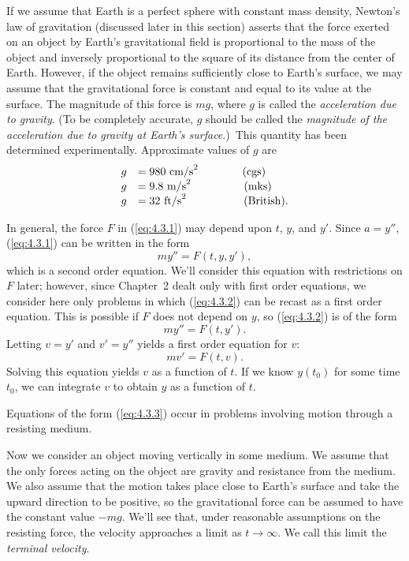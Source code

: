 If we assume that Earth is a perfect sphere with constant mass density, Newton's law of gravitation
(discussed later in this section) asserts that the force exerted on an object by Earth's
gravitational field is proportional to the mass of the object and inversely proportional to the
square of its distance from the center of Earth. However, if the object remains sufficiently close
to Earth's surface, we may assume that the gravitational force is constant and equal to its value at
the surface. The magnitude of this force is $mg$, where $g$ is called the {\color{blue}\it
acceleration due to gravity}. (To be completely accurate, $g$ should be called the {\color{blue}\it
magnitude of the acceleration due to gravity at Earth's surface}.)\
This quantity has been determined experimentally. Approximate values of $g$ are
\[
  \begin{array}{rl}
    g & =980\ \mbox{cm/s}^{2}\hskip40pt\mbox{(cgs)}     \\
    g & =9.8\ \mbox{m/s}^{2}\hskip48pt\mbox{(mks)}      \\
    g & =32\ \mbox{ft/s}^{2}\hskip52pt\mbox{(British)}.
  \end{array}
\]

In general, the force $F$ in (\ref{eq:4.3.1}) may depend upon $t$, $y$, and $y'$. Since $a=y''$,
(\ref{eq:4.3.1}) can be written in the form
\begin{equation}
  \label{eq:4.3.2}my''=F(t,y,y'),
\end{equation}
which is a second order equation. We'll consider this equation with restrictions on $F$ later;
however, since Chapter~2 dealt only with first order equations, we consider here only problems in
which (\ref{eq:4.3.2}) can be recast as a first order equation. This is possible if $F$ does not
depend on $y$, so (\ref{eq:4.3.2}) is of the form
\[
  my''=F(t,y').
\]
Letting $v=y'$ and $v'=y''$ yields a first order equation for $v$:
\begin{equation}
  \label{eq:4.3.3}mv'=F(t,v).
\end{equation}
Solving this equation yields $v$ as a function of $t$. If we know $y(t_{0})$ for some time $t_{0}$,
we can integrate $v$ to obtain $y$ as a function of $t$.

Equations of the form (\ref{eq:4.3.3}) occur in problems involving motion through a resisting
medium.


\noindent
Now we consider an object moving vertically in some medium. We assume that the only forces acting on
the object are gravity and resistance from the medium. We also assume that the motion takes place
close to Earth's surface and take the upward direction to be positive, so the gravitational force
can be assumed to have the constant value $-mg$. We'll see that, under reasonable assumptions on the
resisting force, the velocity approaches a limit as $t\to\infty$. We call this limit the
{\color{blue}\it terminal velocity\/}.

